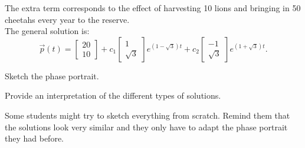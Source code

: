 	The extra term corresponds to the effect of harvesting 10 lions and bringing in 50 cheetahs every year to the reserve. \\
	
	The general solution is:
	$$
	\vec{p}(t) = \begin{bmatrix} 20 \\ 10 \end{bmatrix} +
		c_1 \begin{bmatrix} 1 \\ \sqrt{3} \end{bmatrix} e^{(1-\sqrt{3})t} + c_2 \begin{bmatrix} -1 \\ \sqrt{3} \end{bmatrix} e^{(1+\sqrt{3})t}.
	$$
\begin{parts}
	\item Sketch the phase portrait.
	\item Provide an interpretation of the different types of solutions.
\end{parts}

\begin{annotation}
	\begin{goals}
		Some students might try to sketch everything from scratch.
		Remind them that the solutions look very similar and they only have to adapt the phase portrait they had before.
	\end{goals}
\end{annotation}



\bookonlynewpage


